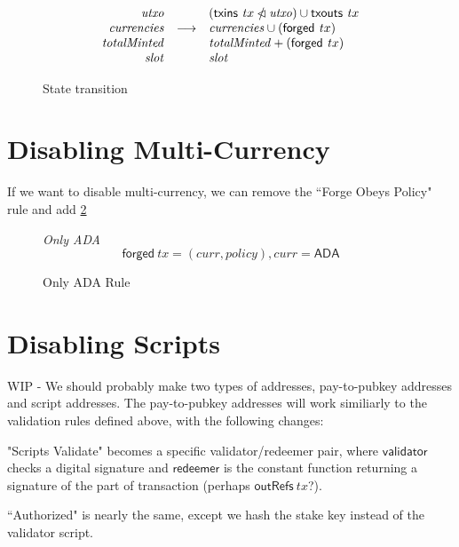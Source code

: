 \documentclass[11pt,a4paper]{article}
\newcommand{\restrictdom}{\lhd}
\newcommand{\subtractdom}{\mathbin{\slashed{\restrictdom}}}
\newcommand{\union}{\cup}
\newcommand{\var}[1]{\mathit{#1}}
\newcommand{\fun}[1]{\mathsf{#1}}
\newcommand{\txins}[1]{\fun{txins}\ \var{#1}}
\newcommand{\txouts}[1]{\fun{txouts}\ \var{#1}}
\newcommand{\forged}[1]{\fun{forged}\ \var{#1}}
\newcommand{\created}[1]{\fun{forged}\ \var{#1}}
\newcommand{\outRefs}[1]{\fun{outRefs}\ \var{#1}}
\begin{document}
\begin{figure}
\begin{equation*}
  \begin{array}{rcl}
    \var{utxo} & & (\txins tx \subtractdom \var{utxo}) \union \txouts tx \\
    \var{currencies} & \longrightarrow & \var{currencies} \union (\created tx) \\
    \var{totalMinted} & & \var{totalMinted} + (\forged tx)\\
    \var{slot} & & \var{slot} \\
  \end{array}
\end{equation*}

\caption{State transition}
\label{fig:state_transitions}
\end{figure}

\section{Disabling Multi-Currency}

If we want to disable multi-currency, we can remove the ``Forge Obeys Policy" rule and
add \cref{fig:only_ada_rule} 
\begin{figure}
\emph{Only ADA}
%
\begin{equation*}
\created tx = (curr, policy), curr = \mathsf{ADA}
\end{equation*}

\caption{Only ADA Rule}
\label{fig:only_ada_rule}
\end{figure}


\section{Disabling Scripts}

WIP - We should probably make two types of addresses, pay-to-pubkey addresses and script addresses.
The pay-to-pubkey addresses will work similiarly to the validation rules defined above, with the
following changes:

"Scripts Validate" becomes a specific validator/redeemer pair, where $\mathsf{validator}$ checks a
digital signature and $\mathsf{redeemer}$ is the constant function returning a signature of the
part of transaction (perhaps $\outRefs tx$?).

``Authorized" is nearly the same, except we hash the stake key instead of the validator script.
\end{document}

